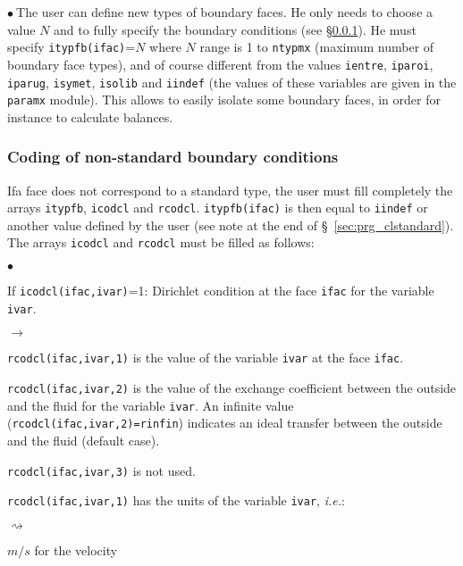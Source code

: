 {{{\noindent
$\bullet\ $The user can define new types of boundary faces. He only needs to
choose a value $N$ and to fully specify the boundary conditions (see
\S\ref{sec:prg_clnonstandard}). He must specify
\texttt{itypfb(ifac)}=$N$ where $N$ range is 1 to
\texttt{ntypmx} (maximum number of boundary face types), and of
course different from the values \texttt{ientre}, \texttt{iparoi},
\texttt{iparug}, \texttt{isymet}, \texttt{isolib} and \texttt{iindef} (the values
of these variables are given in the \texttt{paramx} module). This allows to
easily isolate some boundary faces, in order for instance to calculate balances.

\subsubsection{Coding of non-standard boundary conditions}
\label{sec:prg_clnonstandard}%
Ifa face does not correspond to a standard type, the user
must fill completely the arrays \texttt{itypfb}, \texttt{icodcl} and
\texttt{rcodcl}. \texttt{itypfb(ifac)} is then equal to \texttt{iindef}
or another value defined by the user (see note at the end of \S~\ref{sec:prg_clstandard}). The arrays \texttt{icodcl} and \texttt{rcodcl}
must be filled as follows:

\begin{list}{$\bullet$}{}
\item If \texttt{icodcl(ifac,ivar)}=1: Dirichlet condition at the face
      \texttt{ifac} for the variable \texttt{ivar}.

\begin{list}{$\rightarrow$}{}
\item \texttt{rcodcl(ifac,ivar,1)} is the value of the variable \texttt{ivar}
      at the face \texttt{ifac}.

\item \texttt{rcodcl(ifac,ivar,2)} is the value of the exchange coefficient
      between the outside and the fluid for the variable \texttt{ivar}. An
      infinite value (\texttt{rcodcl(ifac,ivar,2)=rinfin}) indicates an
      ideal transfer between the outside and the fluid (default case).

\item \texttt{rcodcl(ifac,ivar,3)} is not used.

\item \texttt{rcodcl(ifac,ivar,1)} has the units of the variable
      \texttt{ivar}, {\em i.e.}:
\begin{list}{$\rightsquigarrow$}{}
\item $m/s$ for the velocity


\end{list}
\end{list}
\end{list}}}}
